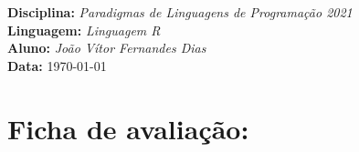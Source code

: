 \begin{comment}
  Prof. Dr. Ausberto S. Castro Vera
  UENF - CCT - LCMAT - Curso de Ciência da Computação
  Campos, RJ,  2021
  Disciplina: Paradigmas de Linguagens de Programação
\end{comment}
\newpage
\noindent
\textbf{Disciplina:}  \textit{Paradigmas de Linguagens de Programação 2021}\\
\textbf{Linguagem:}   \textit{Linguagem R}\\
\textbf{Aluno:}       \textit{João Vítor Fernandes Dias}\\
\textbf{Data:}        \today

\section*{Ficha de avaliação:}
  \begin{tabular}{|p{12cm}|c|}


\end{tabular}
